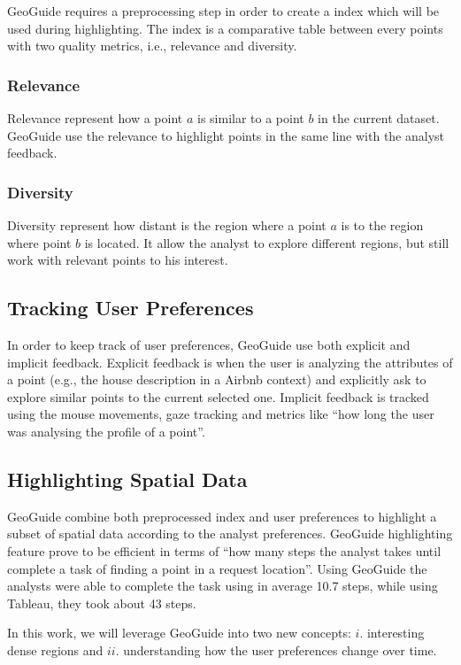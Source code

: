 GeoGuide requires a preprocessing step in order to create a index which will be used during highlighting. The index is a comparative table between every points with two quality metrics, i.e., relevance and diversity.

\subsubsection{Relevance}

Relevance represent how a point $a$ is similar to a point $b$ in the current dataset. GeoGuide use the relevance to highlight points in the same line with the analyst feedback.

\subsubsection{Diversity}

Diversity represent how distant is the region where a point $a$ is to the region where point $b$ is located. It allow the analyst to explore different regions, but still work with relevant points to his interest.

\subsection{Tracking User Preferences}

In order to keep track of user preferences, GeoGuide use both explicit and implicit feedback. Explicit feedback is when the user is analyzing the attributes of a point (e.g., the house description in a Airbnb context) and explicitly ask to explore similar points to the current selected one. Implicit feedback is tracked using the mouse movements, gaze tracking and metrics like ``how long the user was analysing the profile of a point''.

\subsection{Highlighting Spatial Data}

GeoGuide combine both preprocessed index and user preferences to highlight a subset of spatial data according to the analyst preferences. GeoGuide highlighting feature prove to be efficient in terms of ``how many steps the analyst takes until complete a task of finding a point in a request location''. Using GeoGuide the analysts were able to complete the task using in average 10.7 steps, while using Tableau, they took about 43 steps.

\vspace{25pt}

\noindent In this work, we will leverage GeoGuide into two new concepts: $i$. interesting dense regions and $ii$. understanding how the user preferences change over time.

